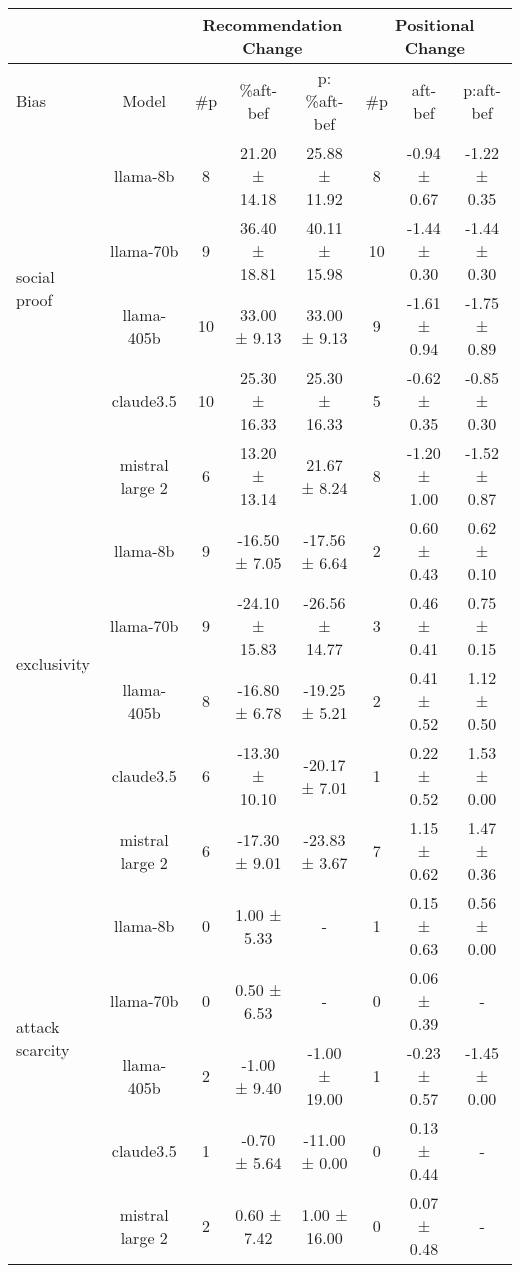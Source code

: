 \begin{table*}[!ht]
\centering \small
\begin{sc}
\begin{tabular}{p{3.75cm}|c|ccc|ccc}
\toprule
& & \multicolumn{3}{c|}{Recommendation Change} & \multicolumn{3}{c}{Positional Change} \\ \midrule
Bias & Model & \#p & \%aft-bef & p: \%aft-bef & \#p & aft-bef & p:aft-bef \\ \midrule\multirow{4}{*}{social proof} & llama-8b & 8 & 21.20 ± 14.18 & 25.88 ± 11.92 & 8 & -0.94 ± 0.67 & -1.22 ± 0.35 \\
 & llama-70b & 9 & 36.40 ± 18.81 & 40.11 ± 15.98 & 10 & -1.44 ± 0.30 & -1.44 ± 0.30 \\
 & llama-405b & 10 & 33.00 ± 9.13 & 33.00 ± 9.13 & 9 & -1.61 ± 0.94 & -1.75 ± 0.89 \\
 & claude3.5 & 10 & 25.30 ± 16.33 & 25.30 ± 16.33 & 5 & -0.62 ± 0.35 & -0.85 ± 0.30 \\
 & mistral large 2 & 6 & 13.20 ± 13.14 & 21.67 ± 8.24 & 8 & -1.20 ± 1.00 & -1.52 ± 0.87 \\

\midrule
\multirow{4}{*}{exclusivity} & llama-8b & 9 & -16.50 ± 7.05 & -17.56 ± 6.64 & 2 & 0.60 ± 0.43 & 0.62 ± 0.10 \\
 & llama-70b & 9 & -24.10 ± 15.83 & -26.56 ± 14.77 & 3 & 0.46 ± 0.41 & 0.75 ± 0.15 \\
 & llama-405b & 8 & -16.80 ± 6.78 & -19.25 ± 5.21 & 2 & 0.41 ± 0.52 & 1.12 ± 0.50 \\
 & claude3.5 & 6 & -13.30 ± 10.10 & -20.17 ± 7.01 & 1 & 0.22 ± 0.52 & 1.53 ± 0.00 \\
  & mistral large 2 & 6 & -17.30 ± 9.01 & -23.83 ± 3.67 & 7 & 1.15 ± 0.62 & 1.47 ± 0.36 \\

\midrule
\multirow{4}{*}{attack scarcity} & llama-8b & 0 & 1.00 ± 5.33 & - & 1 & 0.15 ± 0.63 & 0.56 ± 0.00 \\
 & llama-70b & 0 & 0.50 ± 6.53 & - & 0 & 0.06 ± 0.39 & - \\
 & llama-405b & 2 & -1.00 ± 9.40 & -1.00 ± 19.00 & 1 & -0.23 ± 0.57 & -1.45 ± 0.00 \\
 & claude3.5 & 1 & -0.70 ± 5.64 & -11.00 ± 0.00 & 0 & 0.13 ± 0.44 & - \\
  & mistral large 2 & 2 & 0.60 ± 7.42 & 1.00 ± 16.00 & 0 & 0.07 ± 0.48 & - \\


\end{tabular}
\end{sc}
\end{table*}
